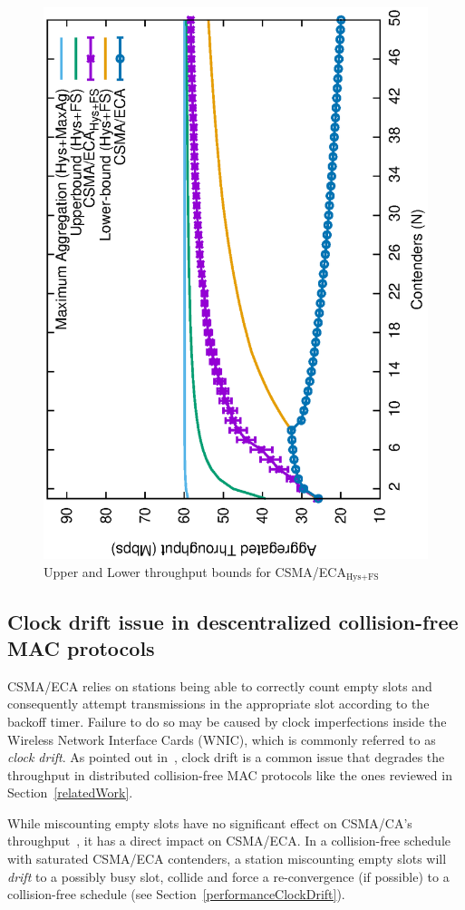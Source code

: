 	\begin{figure}[tb]
	\centering
		\includegraphics[width=0.7\linewidth,angle=-90]{figures/throughput-w-model/throughput-combined-w-model-TON.eps}
		\caption{Upper and Lower throughput bounds for CSMA/ECA$_{\text{Hys+FS}}$}
		\label{fig:ECA-bounds-comparison}
	\end{figure}
	
	\subsection{Clock drift issue in descentralized collision-free MAC protocols}\label{clockDrift-issue}
	CSMA/ECA relies on stations being able to correctly count empty slots and consequently attempt transmissions in the appropriate slot according to the backoff timer. Failure to do so may be caused by clock imperfections inside the Wireless Network Interface Cards (WNIC), which is commonly referred to as \emph{clock drift}. As pointed out in~\cite{slotDrift}, clock drift is a common issue that degrades the throughput in distributed collision-free MAC protocols like the ones reviewed in Section~\ref{relatedWork}.
	
	While miscounting empty slots have no significant effect on CSMA/CA's throughput~\cite{slotDrift}, it has a direct impact on CSMA/ECA. In a collision-free schedule with saturated CSMA/ECA contenders, a station miscounting empty slots will \emph{drift} to a possibly busy slot, collide and force a re-convergence (if possible) to a collision-free schedule (see Section~\ref{performanceClockDrift}).
	
